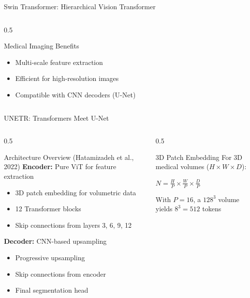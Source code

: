 \documentclass[aspectratio=169]{beamer}
\begin{document}
\begin{frame}{Swin Transformer: Hierarchical Vision Transformer}
\begin{columns}
\begin{column}{0.5\textwidth}
            \begin{alertblock}{Medical Imaging Benefits}
                \begin{itemize}
                    \item Multi-scale feature extraction
                    \item Efficient for high-resolution images
                    \item Compatible with CNN decoders (U-Net)
                \end{itemize}
            \end{alertblock}
        \end{column}
    \end{columns}
\end{frame}

\begin{frame}{UNETR: Transformers Meet U-Net}
    \begin{columns}
        \begin{column}{0.5\textwidth}
            \begin{block}{Architecture Overview (Hatamizadeh et al., 2022)}
                \textbf{Encoder:} Pure ViT for feature extraction
                \begin{itemize}
                    \item 3D patch embedding for volumetric data
                    \item 12 Transformer blocks
                    \item Skip connections from layers 3, 6, 9, 12
                \end{itemize}
                
                \vspace{0.5em}
                \textbf{Decoder:} CNN-based upsampling
                \begin{itemize}
                    \item Progressive upsampling
                    \item Skip connections from encoder
                    \item Final segmentation head
                \end{itemize}
            \end{block}
        \end{column}
        \begin{column}{0.5\textwidth}
            \begin{block}{3D Patch Embedding}
                For 3D medical volumes ($H \times W \times D$):
                \begin{center}
                    $N = \frac{H}{P} \times \frac{W}{P} \times \frac{D}{P}$
                \end{center}
                With $P=16$, a $128^3$ volume yields $8^3 = 512$ tokens
            \end{block}
            

\end{column}
\end{columns}
\end{frame}
\end{document}
